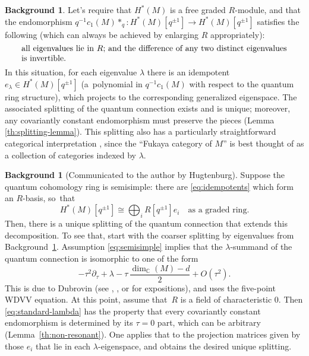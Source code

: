 \documentclass[JEP,XML,SOM,Unicode,NoFloatCountersInSection,published]{cedram}
\theoremstyle{plain}
\theoremstyle{definition}
\newtheorem{background}[theorem]{Background}
\newcommand{\bC}{{\mathbb C}}
\let\iso\cong
\begin{document}
\begin{background} \label{th:eigenvalue-splitting}
Let's require that $H^*(M)$ is a free graded $R$-module, and that the endomorphism $q^{-1} c_1(M) \ast_q: H^*(M)[q^{\pm 1}] \to H^*(M)[q^{\pm 1}]$ satisfies the following (which can always be achieved by enlarging $R$ appropriately):
\begin{equation}\label{eq:differences-are-invertible}
\parbox{32em}{all eigenvalues lie in $R$; and the difference of any two distinct eigenvalues is invertible.}
\end{equation}
In this situation, for each eigenvalue $\lambda$ there is an idempotent $e_{\lambda} \in H^*(M)[q^{\pm 1}]$ (a~polynomial in $q^{-1}c_1(M)$ with respect to the quantum ring structure), which projects to the corresponding generalized eigenspace. The associated splitting of the quantum connection exists and is unique; moreover, any covariantly constant endomorphism must preserve the pieces (Lemma \ref{th:splitting-lemma}). This splitting also has a particularly straightforward categorical interpretation \cite{hugtenburg24}, since the ``Fukaya category of $M$'' is best thought of as a collection of categories indexed by $\lambda$.
\end{background}

\begin{background}[Communicated to the author by Hugtenburg] \label{th:semisimple}
Suppose the quantum cohomology ring is semisimple: there are \eqref{eq:idempotents} which form an $R$-basis, so~that
\begin{equation} \label{eq:semisimple}
H^*(M)[q^{\pm 1}] \iso \bigoplus_i R[q^{\pm 1}]e_i \quad \text{as a graded ring.}
\end{equation}
Then, there is a unique splitting of the quantum connection that extends this decomposition. To see that, start with the coarser splitting by eigenvalues from Background~\ref{th:eigenvalue-splitting}. Assumption \eqref{eq:semisimple} implies that the $\lambda$-summand of the quantum connection is isomorphic to one of the form
\begin{equation} \label{eq:standard-lambda}
- \tau^2\partial_\tau + \lambda - \tau\,\frac{\dim_{\bC}(M)-d}{2} + O(\tau^2).
\end{equation}
This is due to Dubrovin \cite[Lect.\,3]{dubrovin99} (see \cite[\S 2.4]{galkin-golyshev-iritani16}, \cite[\S 6.1]{hugtenburg24}, or \cite[Lem.\,2.1.16]{pomerleano-seidel23} for expositions), and uses the five-point WDVV equation. At this point, assume that~$R$ is a field of characteristic $0$. Then \eqref{eq:standard-lambda} has the property that every covariantly constant endomorphism is determined by its $\tau = 0$ part, which can be arbitrary (Lem\-ma~\ref{th:non-resonant}). One applies that to the projection matrices given by those $e_i$ that lie in each $\lambda$\nobreakdash-eigenspace, and obtains the desired unique splitting.
\end{background}
\end{document}
